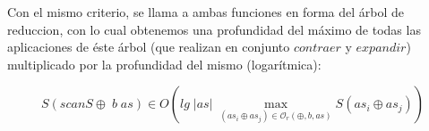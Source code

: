 \documentclass[a4paper,10pt]{article}
\begin{document}
    Con el mismo criterio, se llama a ambas funciones en forma del árbol de reduccion,
con lo cual obtenemos una profundidad del máximo de todas las aplicaciones de éste árbol 
(que realizan en conjunto $contraer$ y $expandir$) multiplicado por la profundidad del
mismo (logarítmica): 

\begin{equation*}
    S \left( scanS \oplus \; b \; as \right) \in
    O \left( lg \;\vert as \vert\; \max_{(as_i \oplus as_j) \in \mathcal{O}_r(\oplus,b,as)} S \left( as_i \oplus as_j \right) \right)
\end{equation*}




\end{document}
